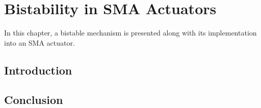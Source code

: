 
\chapter{Bistability in SMA Actuators}
In this chapter, a bistable mechanism is presented along with its implementation into an SMA actuator.
\section{Introduction}
\section{Conclusion}
